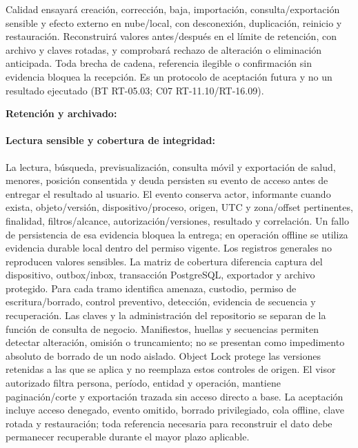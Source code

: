 Calidad ensayará creación, corrección, baja, importación, consulta/exportación sensible y efecto externo en nube/local, con desconexión, duplicación, reinicio y restauración. Reconstruirá valores antes/después en el límite de retención, con archivo y claves rotadas, y comprobará rechazo de alteración o eliminación anticipada. Toda brecha de cadena, referencia ilegible o confirmación sin evidencia bloquea la recepción. Es un protocolo de aceptación futura y no un resultado ejecutado (BT RT-05.03; C07 RT-11.10/RT-16.09).

\textbf{Retención y archivado:} 
\paragraph{Lectura sensible y cobertura de integridad:}
La lectura, búsqueda, previsualización, consulta móvil y exportación de salud, menores, posición consentida y deuda persisten su evento de acceso antes de entregar el resultado al usuario. El evento conserva actor, informante cuando exista, objeto/versión, dispositivo/proceso, origen, UTC y zona/offset pertinentes, finalidad, filtros/alcance, autorización/versiones, resultado y correlación. Un fallo de persistencia de esa evidencia bloquea la entrega; en operación offline se utiliza evidencia durable local dentro del permiso vigente. Los registros generales no reproducen valores sensibles.
La matriz de cobertura diferencia captura del dispositivo, outbox/inbox, transacción PostgreSQL, exportador y archivo protegido. Para cada tramo identifica amenaza, custodio, permiso de escritura/borrado, control preventivo, detección, evidencia de secuencia y recuperación. Las claves y la administración del repositorio se separan de la función de consulta de negocio. Manifiestos, huellas y secuencias permiten detectar alteración, omisión o truncamiento; no se presentan como impedimento absoluto de borrado de un nodo aislado. Object Lock protege las versiones retenidas a las que se aplica y no reemplaza estos controles de origen.
El visor autorizado filtra persona, período, entidad y operación, mantiene paginación/corte y exportación trazada sin acceso directo a base. La aceptación incluye acceso denegado, evento omitido, borrado privilegiado, cola offline, clave rotada y restauración; toda referencia necesaria para reconstruir el dato debe permanecer recuperable durante el mayor plazo aplicable.

